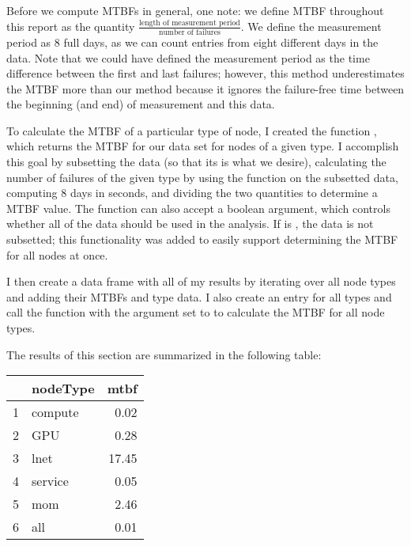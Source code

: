Before we compute MTBFs in general, one note: we define MTBF throughout this report as the quantity $\frac{\textrm{length of measurement period}}{\textrm{number of failures}}$.  We define the measurement period as 8 full days, as we can count entries from eight different days in the data.  Note that we could have defined the measurement period as the time difference between the first and last failures; however, this method underestimates the MTBF more than our method because it ignores the failure-free time between the beginning (and end) of measurement and this data.

To calculate the MTBF of a particular type of node, I created the function , which returns the MTBF for our data set for nodes of a given type.  I accomplish this goal by subsetting the data (so that its  is what we desire), calculating the number of failures of the given type by using the  function on the subsetted data, computing 8 days in seconds, and dividing the two quantities to determine a MTBF value.  The function can also accept a boolean  argument, which controls whether all of the data should be used in the analysis.  If  is , the data is not subsetted; this functionality was added to easily support determining the MTBF for all nodes at once.

I then create a data frame with all of my results by iterating over all node types and adding their MTBFs and type data.  I also create an entry for all types and call the  function with the  argument set to  to calculate the MTBF for all node types.

The results of this section are summarized in the following table:

\begin{table}[ht]
\centering
\begin{tabular}{rlr}
  \hline
 & nodeType & mtbf \\ 
  \hline
1 & compute & 0.02 \\ 
  2 & GPU & 0.28 \\ 
  3 & lnet & 17.45 \\ 
  4 & service & 0.05 \\ 
  5 & mom & 2.46 \\ 
  6 & all & 0.01 \\ 
   \hline
\end{tabular}
\end{table}
